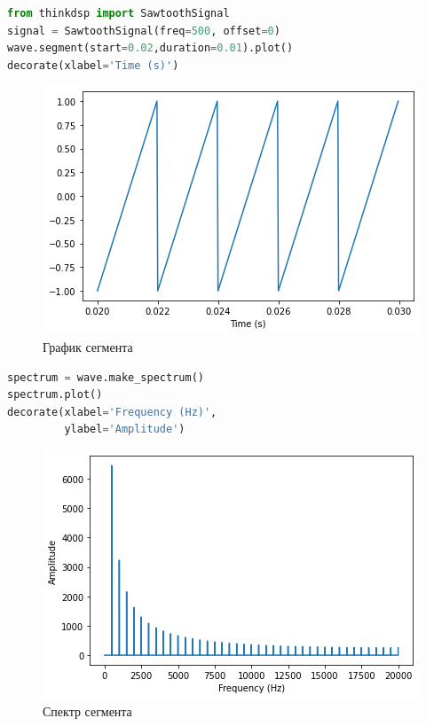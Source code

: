 \begin{lstlisting}[language=Python]
from thinkdsp import SawtoothSignal
signal = SawtoothSignal(freq=500, offset=0)
wave.segment(start=0.02,duration=0.01).plot()
decorate(xlabel='Time (s)')
\end{lstlisting}
\begin{figure}[H]
	\begin{center}
		\includegraphics[scale=1]{fig/lab06/lab06_4.png}
		\caption{График сегмента}
	\end{center}
\end{figure}

\begin{lstlisting}[language=Python]
spectrum = wave.make_spectrum()
spectrum.plot()
decorate(xlabel='Frequency (Hz)',
         ylabel='Amplitude')
\end{lstlisting}

\begin{figure}[H]
	\begin{center}
		\includegraphics[scale=1]{fig/lab06/lab06_5.png}
		\caption{Спектр сегмента}
	\end{center}
\end{figure}

